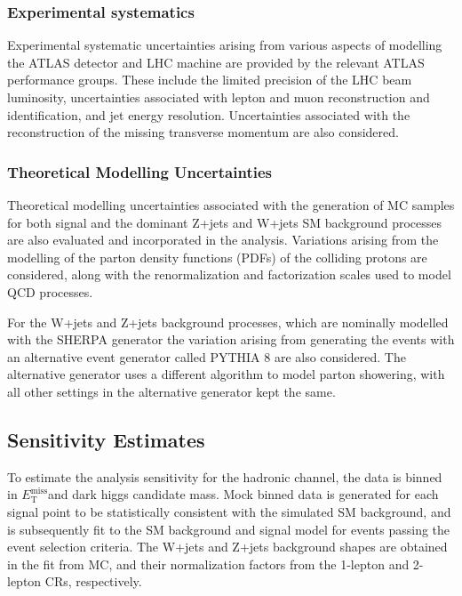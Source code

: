 \documentclass[12pt]{article}
\newcommand*{\met}{\ensuremath{E_\text{T}^\text{miss}}}
\begin{document}
\subsubsection{Experimental systematics}

Experimental systematic uncertainties arising from various aspects of modelling the ATLAS detector and LHC machine are provided by the relevant ATLAS performance groups. These include the limited precision of the LHC beam luminosity, uncertainties associated with lepton and muon reconstruction and identification, and jet energy resolution. Uncertainties associated with the reconstruction of the missing transverse momentum are also considered. 

\subsubsection{Theoretical Modelling Uncertainties}

Theoretical modelling uncertainties associated with the generation of MC samples for both signal and the dominant Z+jets and W+jets SM background processes are also evaluated and incorporated in the analysis. Variations arising from the modelling of the parton density functions (PDFs) \cite{PDG_PDF} of the colliding protons are considered, along with the renormalization and factorization scales \cite{PDG_QCD} used to model QCD processes. 

For the W+jets and Z+jets background processes, which are nominally modelled with the SHERPA generator \cite{SHERPA} the variation arising from generating the events with an alternative event generator called PYTHIA 8 \cite{PYTHIA8} are also considered. The alternative generator uses a different algorithm to model parton showering, with all other settings in the alternative generator kept the same. 

\subsection{Sensitivity Estimates}

To estimate the analysis sensitivity for the hadronic channel, the data is binned in \met and dark higgs candidate mass. Mock binned data is generated for each signal point to be statistically consistent with the simulated SM background, and is subsequently fit to the SM background and signal model for events passing the event selection criteria. The W+jets and Z+jets background shapes are obtained in the fit from MC, and their normalization factors from the 1-lepton and 2-lepton CRs, respectively. 
\end{document}
